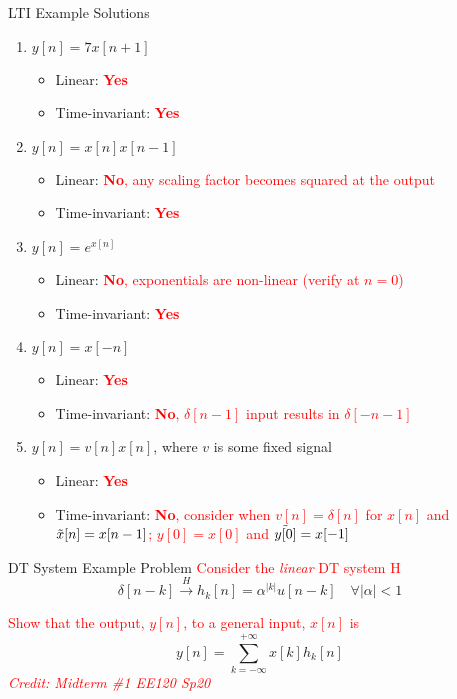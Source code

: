 \begin{frame}{LTI Example Solutions}
    \begin{enumerate}
        \item $y[n] = 7x[n+1]$
        \begin{itemize}
            \item Linear: \textcolor{red}{\textbf{Yes}}
            \item Time-invariant: \textcolor{red}{\textbf{Yes}}
        \end{itemize}
        \item $y[n] = x[n]x[n-1]$
        \begin{itemize}
            \item Linear: \textcolor{red}{\textbf{No}, any scaling factor becomes squared at the output}
            \item Time-invariant: \textcolor{red}{\textbf{Yes}}
        \end{itemize}
        \item $y[n] = e^{x[n]}$
        \begin{itemize}
            \item Linear: \textcolor{red}{\textbf{No}, exponentials are non-linear (verify at $n=0$)}
            \item Time-invariant: \textcolor{red}{\textbf{Yes}}
        \end{itemize}
        \item $y[n] = x[-n]$
        \begin{itemize}
            \item Linear: \textcolor{red}{\textbf{Yes}}
            \item Time-invariant: \textcolor{red}{\textbf{No}, $\delta[n-1]$ input results in $\delta[-n-1]$}
        \end{itemize}
        \item $y[n] = v[n]x[n]$, where $v$ is some fixed signal
        \begin{itemize}
            \item Linear: \textcolor{red}{\textbf{Yes}}
            \item Time-invariant: \textcolor{red}{\textbf{No}, consider when $v[n] = \delta[n]$ for $x[n]$ and $\Tilde{x}[n] = x[n-1]$; $y[0] = x[0]$ and $\Tilde{y[0]} = x[-1]$}
        \end{itemize}
    \end{enumerate}
\end{frame}

\begin{frame}{DT System Example Problem}
    \textcolor{red}{Consider the \textit{linear} DT system H}
    \[
    \delta[n-k] \overset{H}{\longrightarrow} h_k[n] = \alpha^{|k|}u[n-k] \quad \forall |\alpha| < 1
    \]
    
    \vspace{30px}
    
    \textcolor{red}{Show that the output, $y[n]$, to a general input, $x[n]$ is}
    \[
        y[n] = \sum_{k=-\infty}^{+\infty}x[k]h_k[n]
    \]
    {\footnotesize\textcolor{red}{\textit{Credit: Midterm \#1 EE120 Sp20}}}
    
\end{frame}

